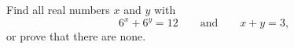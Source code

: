 Find all real numbers $x$ and $y$ with
\[
6^x+6^y=12\qquad\text{and}\qquad x+y=3,
\]
or prove that there are none.
